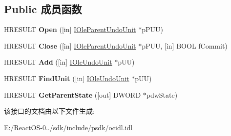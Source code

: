 \subsection*{Public 成员函数}
\begin{DoxyCompactItemize}
\item 
\mbox{\label{interface_i_ole_parent_undo_unit_a56aec4e60ffe67b58b1e32432f699be0}} 
H\+R\+E\+S\+U\+LT {\bfseries Open} (\mbox{[}in\mbox{]} \hyperlink{interface_i_ole_parent_undo_unit}{I\+Ole\+Parent\+Undo\+Unit} $\ast$p\+P\+UU)
\item 
\mbox{\label{interface_i_ole_parent_undo_unit_a2c100a5d05c7b09066b448edf7e79d61}} 
H\+R\+E\+S\+U\+LT {\bfseries Close} (\mbox{[}in\mbox{]} \hyperlink{interface_i_ole_parent_undo_unit}{I\+Ole\+Parent\+Undo\+Unit} $\ast$p\+P\+UU, \mbox{[}in\mbox{]} B\+O\+OL f\+Commit)
\item 
\mbox{\label{interface_i_ole_parent_undo_unit_ae568607d5a6a622d7351f66e9ba19b25}} 
H\+R\+E\+S\+U\+LT {\bfseries Add} (\mbox{[}in\mbox{]} \hyperlink{interface_i_ole_undo_unit}{I\+Ole\+Undo\+Unit} $\ast$p\+UU)
\item 
\mbox{\label{interface_i_ole_parent_undo_unit_a7c9e2621dc6bc33bf53a112eb03a92c9}} 
H\+R\+E\+S\+U\+LT {\bfseries Find\+Unit} (\mbox{[}in\mbox{]} \hyperlink{interface_i_ole_undo_unit}{I\+Ole\+Undo\+Unit} $\ast$p\+UU)
\item 
\mbox{\label{interface_i_ole_parent_undo_unit_a2e6140dcc6db935bea46aadc8fa974a3}} 
H\+R\+E\+S\+U\+LT {\bfseries Get\+Parent\+State} (\mbox{[}out\mbox{]} D\+W\+O\+RD $\ast$pdw\+State)
\end{DoxyCompactItemize}


该接口的文档由以下文件生成\+:\begin{DoxyCompactItemize}
\item 
E\+:/\+React\+O\+S-\/0../sdk/include/psdk/ocidl.\+idl\end{DoxyCompactItemize}
